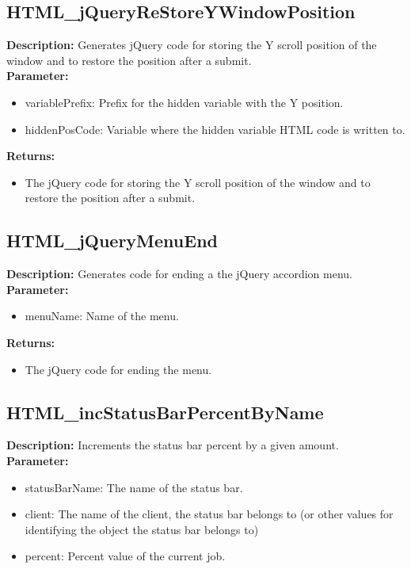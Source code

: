 \subsection{HTML\_jQueryReStoreYWindowPosition}
\textbf{Description:} Generates jQuery code for storing the Y scroll position of the window and to restore the position after a submit.\\
\textbf{Parameter:}
\begin{itemize}
\item variablePrefix: Prefix for the hidden variable with the Y position.
\item hiddenPosCode: Variable where the hidden variable HTML code is written to.
\end{itemize}
\textbf{Returns:}
\begin{itemize}
\item The jQuery code for storing the Y scroll position of the window and to restore the position after a submit.
\end{itemize}

\subsection{HTML\_jQueryMenuEnd}
\textbf{Description:} Generates code for ending a the jQuery accordion menu.\\
\textbf{Parameter:}
\begin{itemize}
\item menuName: Name of the menu.
\end{itemize}
\textbf{Returns:}
\begin{itemize}
\item The jQuery code for ending the menu.
\end{itemize}

\subsection{HTML\_incStatusBarPercentByName}
\textbf{Description:} Increments the status bar percent by a given amount.\\
\textbf{Parameter:}
\begin{itemize}
\item statusBarName: The name of the status bar.
\item client: The name of the client, the status bar belongs to (or other values for identifying the object the status bar belongs to)
\item percent: Percent value of the current job.
\end{itemize}

